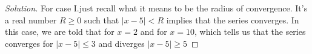 \begin{proof}[Solution]
For case I.\@ just recall what it means to be the radius of
convergence. It's a real number $R\geq 0$ such that $|x-5|<R$ implies that
the series converges. In this case, we are told that for $x=2$ and for
$x=10$, which tells us that the series converges for $|x-5|\leq 3$ and
diverges $|x-5|\geq 5$
\end{proof}

\begin{center}
{\large{}}
\end{center}

